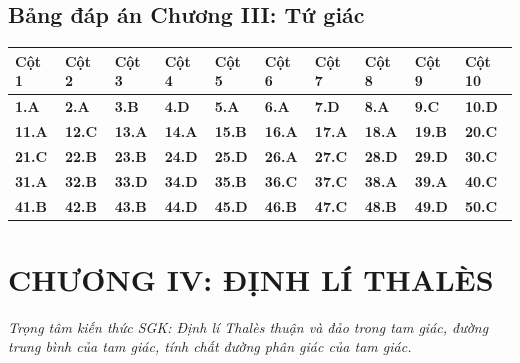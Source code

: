 \documentclass[11pt,a4paper]{article}
\begin{document}
\subsection*{\color{primary} Bảng đáp án Chương III: Tứ giác}
\begin{center}
\renewcommand{\arraystretch}{1.25}
\begin{tabularx}{\textwidth}{*{10}{>{\centering\arraybackslash}X}}
\toprule
\textbf{\color{primary} Cột 1} & \textbf{\color{primary} Cột 2} & \textbf{\color{primary} Cột 3} & \textbf{\color{primary} Cột 4} & \textbf{\color{primary} Cột 5} & \textbf{\color{primary} Cột 6} & \textbf{\color{primary} Cột 7} & \textbf{\color{primary} Cột 8} & \textbf{\color{primary} Cột 9} & \textbf{\color{primary} Cột 10} \\
\midrule
\textbf{1.A} & \textbf{2.A} & \textbf{3.B} & \textbf{4.D} & \textbf{5.A} & \textbf{6.A} & \textbf{7.D} & \textbf{8.A} & \textbf{9.C} & \textbf{10.D} \\
\rowcolor{rowtint} \textbf{11.A} & \textbf{12.C} & \textbf{13.A} & \textbf{14.A} & \textbf{15.B} & \textbf{16.A} & \textbf{17.A} & \textbf{18.A} & \textbf{19.B} & \textbf{20.C} \\
\textbf{21.C} & \textbf{22.B} & \textbf{23.B} & \textbf{24.D} & \textbf{25.D} & \textbf{26.A} & \textbf{27.C} & \textbf{28.D} & \textbf{29.D} & \textbf{30.C} \\
\rowcolor{rowtint} \textbf{31.A} & \textbf{32.B} & \textbf{33.D} & \textbf{34.D} & \textbf{35.B} & \textbf{36.C} & \textbf{37.C} & \textbf{38.A} & \textbf{39.A} & \textbf{40.C} \\
\textbf{41.B} & \textbf{42.B} & \textbf{43.B} & \textbf{44.D} & \textbf{45.D} & \textbf{46.B} & \textbf{47.C} & \textbf{48.B} & \textbf{49.D} & \textbf{50.C} \\
\bottomrule
\end{tabularx}
\end{center}\vspace{10pt}
\section*{\color{primary} CHƯƠNG IV: ĐỊNH LÍ THALÈS}
\textit{Trọng tâm kiến thức SGK: Định lí Thalès thuận và đảo trong tam giác, đường trung bình của tam giác, tính chất đường phân giác của tam giác.}\par\vspace{4pt}
\end{document}
